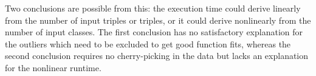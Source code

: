 Two conclusions are possible from this:
the execution time could derive linearly from the number of input triples or  triples,
or it could derive nonlinearly from the number of input classes.
The first conclusion has no satisfactory explanation for the outliers
which need to be excluded to get good function fits,
whereas the second conclusion requires no cherry-picking in the data
but lacks an explanation for the nonlinear runtime.




